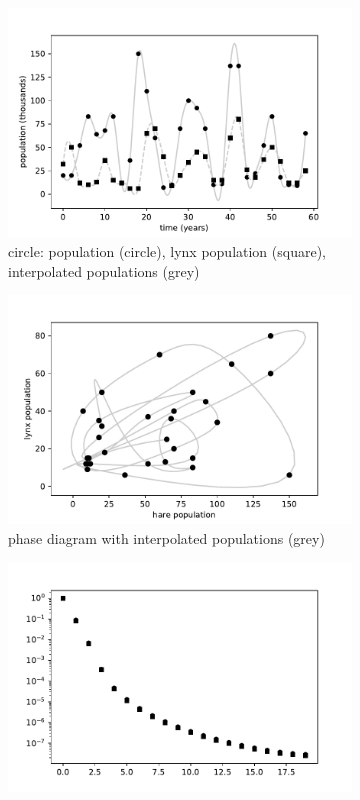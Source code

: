 \documentclass[10pt]{article}
\begin{document}
\begin{figure}[!b]
\begin{subfigure}[t]{.3\textwidth}\centering
  \includegraphics[width=\textwidth]{img/P/interp.pdf}
  \caption{circle: population (circle), lynx population (square), interpolated populations (grey)}
  \label{popvt}
\end{subfigure}\hfill
\begin{subfigure}[t]{.3\textwidth}\centering
  \includegraphics[width=\textwidth]{img/P/phase.pdf}
  \caption{phase diagram with interpolated populations (grey)}
  \label{popphase}
\end{subfigure}\hfill
\begin{subfigure}[t]{.3\textwidth}\centering
  \includegraphics[width=\textwidth]{img/P/time_delay.pdf}

\end{subfigure}
\end{figure}
\end{document}
